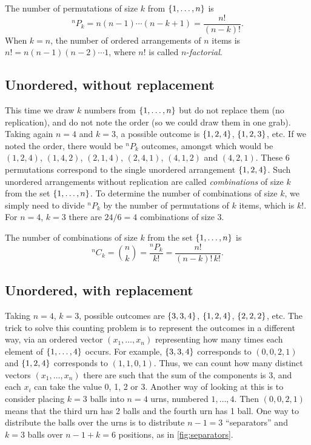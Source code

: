 \begin{theorem}\label{thm:count-ordered-without-replacement}
The number of permutations of size $k$ from $\left\{ 1, \ldots, n \right\}$ is
\[
  {}^nP_k = n(n-1)\cdots(n-k+1) = \frac{n!}{(n-k)!}.
\]
When $k = n$, the number of ordered arrangements of $n$ items is $n! = n(n-1)(n-2)\cdots 1$, where $n!$ is called $n$-\emph{factorial}.
\end{theorem}

\subsection{Unordered, without replacement}\label{sec:count-unordered-without}

This time we draw $k$ numbers from $\left\{ 1, \ldots, n \right\}$ but do not replace them (no replication), and do not note the order (so we could draw them in one grab). Taking again $n = 4$ and $k = 3$, a possible outcome is $\left\{ 1, 2, 4 \right\}$, $\left\{ 1, 2, 3 \right\}$, etc. If we noted the order, there would be ${}^nP_k$ outcomes, amongst which would be $(1,2,4)$, $(1,4,2)$, $(2,1,4)$, $(2,4,1)$, $(4,1,2)$ and $(4,2,1)$. These 6 permutations correspond to the single unordered arrangement $\left\{ 1, 2, 4 \right\}$. Such unordered arrangements without replication are called \emph{combinations} of size $k$ from the set $\left\{ 1, \ldots, n \right\}$. To determine the number of combinations of size $k$, we simply need to divide ${}^nP_k$ by the number of permutations of $k$ items, which is $k!$. For $n = 4$, $k = 3$ there are $24/6 = 4$ combinations of size 3.

\begin{theorem}\label{thm:count-unordered-without-replacement}
The number of combinations of size $k$ from the set $\left\{ 1, \ldots, n \right\}$ is
\[
  {}^nC_k = \binom{n}{k} = \frac{{}^nP_k}{k!} = \frac{n!}{(n-k)!\,k!}.
\]
\end{theorem}

\subsection{Unordered, with replacement}\label{sec:count-unordered-with}

Taking $n = 4$, $k = 3$, possible outcomes are $\left\{ 3, 3, 4 \right\}$, $\left\{ 1, 2, 4 \right\}$, $\left\{ 2, 2, 2 \right\}$, etc. The trick to solve this counting problem is to represent the outcomes in a different way, via an ordered vector $(x_1, \ldots, x_n)$ representing how many times each element of $\left\{ 1, \ldots, 4 \right\}$ occurs. For example, $\left\{ 3, 3, 4 \right\}$ corresponds to $(0, 0, 2, 1)$ and $\left\{ 1, 2, 4 \right\}$ corresponds to $(1, 1, 0, 1)$. Thus, we can count how many distinct vectors $(x_1, \ldots, x_n)$ there are such that the sum of the components is 3, and each $x_i$ can take the value 0, 1, 2 or 3. Another way of looking at this is to consider placing $k = 3$ balls into $n = 4$ urns, numbered $1, \ldots, 4$. Then $(0, 0, 2, 1)$ means that the third urn has 2 balls and the fourth urn has 1 ball. One way to distribute the balls over the urns is to distribute $n - 1 = 3$ ``separators'' and $k = 3$ balls over $n - 1 + k = 6$ positions, as in \cref{fig:separators}.

